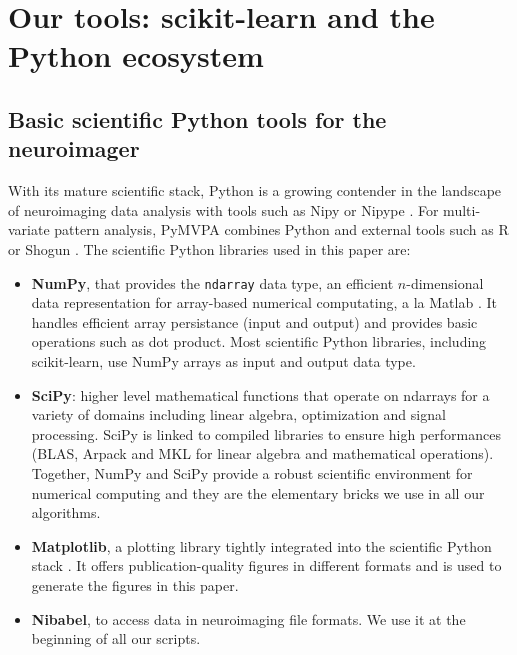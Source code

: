\documentclass{frontiersSCNS} %
\begin{document}
\section{Our tools: scikit-learn and the Python ecosystem}

\subsection{Basic scientific Python tools for the neuroimager}

With its mature scientific stack, Python is a growing contender in the
landscape of neuroimaging data analysis with tools such as Nipy
\citep{millman2007analysis} or Nipype \citep{gorgolewski2011}.
For multi-variate pattern analysis, PyMVPA \citep{hanke2009pymvpa}
combines Python and external tools such as R or Shogun
\citep{sonnenburg2010}. 
The scientific Python libraries used in this paper are:
\begin{itemize}
    \item{\bf NumPy}, that provides the \verb!ndarray! data type, an efficient $n$-dimensional data
        representation for array-based numerical computating, a la Matlab
        \citep{vanderwalt2011}. It handles efficient array persistance
        (input and output) and provides basic operations such as dot
        product. Most scientific Python libraries, including scikit-learn, 
	use NumPy arrays
        as input and output data type.

    \item{\bf SciPy}: higher level mathematical functions that operate on ndarrays for
        a variety of domains including linear algebra, optimization and signal
        processing. SciPy is linked to compiled libraries to ensure high
        performances (BLAS, Arpack and MKL for linear algebra and mathematical
        operations).
        Together, NumPy and SciPy provide a robust scientific environment
        for numerical computing and they are the elementary bricks we use in all our
        algorithms.

    \item{\bf Matplotlib}, a plotting library tightly integrated into the
        scientific Python stack \citep{hunter2007}. It offers publication-quality figures in
        different formats and is used to generate the figures in
	this paper.

    \item{\bf Nibabel}, to access data in neuroimaging file formats.
	We use it at the beginning of all our scripts.
\end{itemize}
\end{document}
